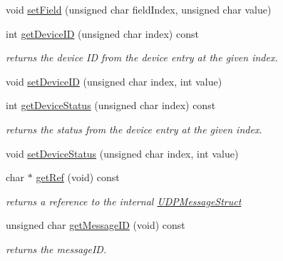 \begin{DoxyCompactItemize}
void \hyperlink{class_u_d_p_message_ad7f1c729cf357be18e6cda695f5e5d99}{set\+Field} (unsigned char field\+Index, unsigned char value)
\item 
\mbox{\label{class_u_d_p_message_a83b544583226eb4e6b51237c9f350e0f}} 
int \hyperlink{class_u_d_p_message_a83b544583226eb4e6b51237c9f350e0f}{get\+Device\+ID} (unsigned char index) const
\begin{DoxyCompactList}\small\item\em returns the device ID from the device entry at the given index. \end{DoxyCompactList}\item 
void \hyperlink{class_u_d_p_message_a9cf9c5e20119a221ee36412e0c1d39c5}{set\+Device\+ID} (unsigned char index, int value)
\item 
\mbox{\label{class_u_d_p_message_acc249c0f6c658bc56c2161946715eb22}} 
int \hyperlink{class_u_d_p_message_acc249c0f6c658bc56c2161946715eb22}{get\+Device\+Status} (unsigned char index) const
\begin{DoxyCompactList}\small\item\em returns the status from the device entry at the given index. \end{DoxyCompactList}\item 
void \hyperlink{class_u_d_p_message_a2dcad6fc97802808675fb9259727da64}{set\+Device\+Status} (unsigned char index, int value)
\item 
\mbox{\label{class_u_d_p_message_aeea2288e53b4c6db7861181b5fc8aa5e}} 
char $\ast$ \hyperlink{class_u_d_p_message_aeea2288e53b4c6db7861181b5fc8aa5e}{get\+Ref} (void) const
\begin{DoxyCompactList}\small\item\em returns a reference to the internal \hyperlink{struct_u_d_p_message_struct}{U\+D\+P\+Message\+Struct} \end{DoxyCompactList}\item 
\mbox{\label{class_u_d_p_message_a9e762f6c16fa298afe87b9dd6cee41c2}} 
unsigned char \hyperlink{class_u_d_p_message_a9e762f6c16fa298afe87b9dd6cee41c2}{get\+Message\+ID} (void) const
\begin{DoxyCompactList}\small\item\em returns the message\+ID. \end{DoxyCompactList}\item 

\end{DoxyCompactItemize}
